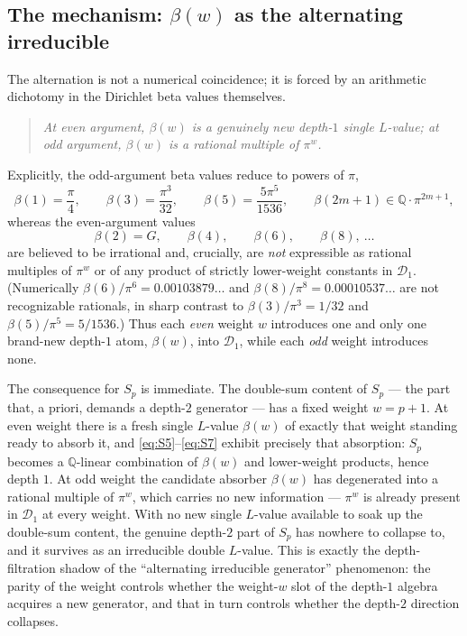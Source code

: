\documentclass[11pt]{article}
\theoremstyle{plain}
\theoremstyle{remark}
\begin{document}
\subsection{The mechanism: $\beta(w)$ as the alternating irreducible}

The alternation is not a numerical coincidence; it is forced by an arithmetic dichotomy in the Dirichlet beta values themselves.

\begin{quote}
\emph{At even argument, $\beta(w)$ is a genuinely new depth-$1$ single $L$-value; at odd argument, $\beta(w)$ is a rational multiple of $\pi^w$.}
\end{quote}

Explicitly, the odd-argument beta values reduce to powers of $\pi$,
\[
  \beta(1) = \frac{\pi}{4},\qquad
  \beta(3) = \frac{\pi^3}{32},\qquad
  \beta(5) = \frac{5\pi^5}{1536},\qquad
  \beta(2m+1) \in \mathbb{Q}\cdot\pi^{2m+1},
\]
whereas the even-argument values
\[
  \beta(2) = G,\qquad \beta(4),\qquad \beta(6),\qquad \beta(8),\ \dots
\]
are believed to be irrational and, crucially, are \emph{not} expressible as rational multiples of $\pi^{w}$ or of any product of strictly lower-weight constants in $\mathcal{D}_1$. (Numerically $\beta(6)/\pi^6 = 0.00103879\ldots$ and $\beta(8)/\pi^8 = 0.00010537\ldots$ are not recognizable rationals, in sharp contrast to $\beta(3)/\pi^3 = 1/32$ and $\beta(5)/\pi^5 = 5/1536$.) Thus each \emph{even} weight $w$ introduces one and only one brand-new depth-$1$ atom, $\beta(w)$, into $\mathcal{D}_1$, while each \emph{odd} weight introduces none.

The consequence for $S_p$ is immediate. The double-sum content of $S_p$ --- the part that, a priori, demands a depth-$2$ generator --- has a fixed weight $w=p+1$. At even weight there is a fresh single $L$-value $\beta(w)$ of exactly that weight standing ready to absorb it, and \eqref{eq:S5}--\eqref{eq:S7} exhibit precisely that absorption: $S_p$ becomes a $\mathbb{Q}$-linear combination of $\beta(w)$ and lower-weight products, hence depth $1$. At odd weight the candidate absorber $\beta(w)$ has degenerated into a rational multiple of $\pi^{w}$, which carries no new information --- $\pi^w$ is already present in $\mathcal{D}_1$ at every weight. With no new single $L$-value available to soak up the double-sum content, the genuine depth-$2$ part of $S_p$ has nowhere to collapse to, and it survives as an irreducible double $L$-value. This is exactly the depth-filtration shadow of the ``alternating irreducible generator'' phenomenon: the parity of the weight controls whether the weight-$w$ slot of the depth-$1$ algebra acquires a new generator, and that in turn controls whether the depth-$2$ direction collapses.
\end{document}
